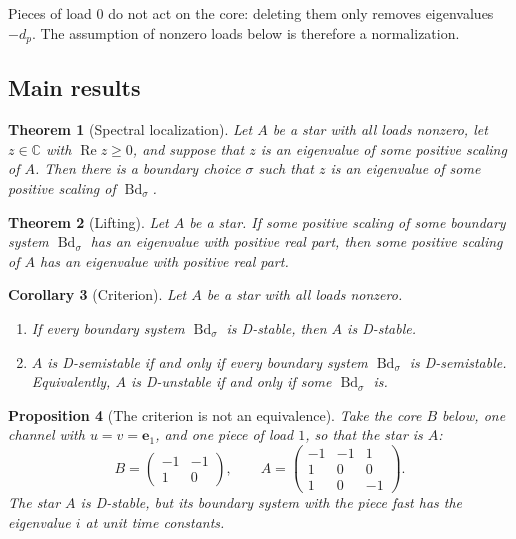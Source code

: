 \documentclass[11pt,a4paper]{article}
\theoremstyle{plain}
\newtheorem{theorem}{Theorem}[section]
\newtheorem{proposition}[theorem]{Proposition}
\newtheorem{corollary}[theorem]{Corollary}
\theoremstyle{definition}
\theoremstyle{remark}
\newcommand{\C}{\mathbb{C}}
\newcommand{\Real}{\operatorname{Re}}
\newcommand{\Bd}{\operatorname{Bd}}
\newcommand{\be}{\mathbf{e}}
\begin{document}
Pieces of load $0$ do not act on the core: deleting them only removes eigenvalues $-d_p$.
The assumption of nonzero loads below is therefore a normalization.

\subsection{Main results}

\begin{theorem}[Spectral localization]\label{thm:localization}
Let $A$ be a star with all loads nonzero, let $z\in\C$ with $\Real z\ge0$, and suppose
that $z$ is an eigenvalue of some positive scaling of $A$. Then there is a boundary choice
$\sigma$ such that $z$ is an eigenvalue of some positive scaling of $\Bd_\sigma$.
\end{theorem}

\begin{theorem}[Lifting]\label{thm:lifting}
Let $A$ be a star. If some positive scaling of some boundary system $\Bd_\sigma$ has an
eigenvalue with positive real part, then some positive scaling of $A$ has an eigenvalue
with positive real part.
\end{theorem}

\begin{corollary}[Criterion]\label{cor:criterion}
Let $A$ be a star with all loads nonzero.
\begin{enumerate}[label=(\alph*)]
  \item If every boundary system $\Bd_\sigma$ is D-stable, then $A$ is D-stable.
  \item $A$ is D-semistable if and only if every boundary system $\Bd_\sigma$ is
    D-semistable. Equivalently, $A$ is D-unstable if and only if some $\Bd_\sigma$ is.
\end{enumerate}
\end{corollary}

\begin{proposition}[The criterion is not an equivalence]\label{prop:gap}
Take the core $B$ below, one channel with $u=v=\be_1$, and one piece of load $1$, so that
the star is $A$:
\[
  B=\begin{pmatrix}-1&-1\\1&0\end{pmatrix},\qquad
  A=\begin{pmatrix}-1&-1&1\\1&0&0\\1&0&-1\end{pmatrix}.
\]
The star $A$ is D-stable, but its boundary system with the piece fast has the eigenvalue
$i$ at unit time constants.
\end{proposition}
\end{document}

